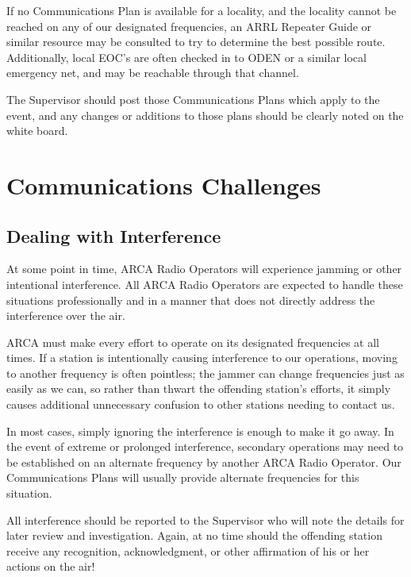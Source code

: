 \documentclass[pdflatex,letterpaper,twoside,12pt]{book}
\begin{document}
If no Communications Plan is available for a locality, and the locality cannot be reached on any of our designated frequencies, an ARRL Repeater Guide or similar resource may be consulted to try to determine the best possible route.  Additionally, local EOC's are often checked in to ODEN or a similar local emergency net, and may be reachable through that channel.

The Supervisor should post those Communications Plans which apply to the event, and any changes or additions to those plans should be clearly noted on the white board.


\section{Communications Challenges}

\subsection{Dealing with Interference}

At some point in time, ARCA Radio Operators will experience jamming or other intentional interference.  All ARCA Radio Operators are expected to handle these situations professionally and in a manner that does not directly address the interference over the air.

ARCA must make every effort to operate on its designated frequencies at all times.  If a station is intentionally causing interference to our operations, moving to another frequency is often pointless;  the jammer can change frequencies just as easily as we can, so rather than thwart the offending station's efforts, it simply causes additional unnecessary confusion to other stations needing to contact us.

In most cases, simply ignoring the interference is enough to make it go away.  In the event of extreme or prolonged interference, secondary operations may need to be established on an alternate frequency by another ARCA Radio Operator.  Our Communications Plans will usually provide alternate frequencies for this situation.

All interference should be reported to the Supervisor who will note the details for later review and investigation.
Again, at no time should the offending station receive any recognition, acknowledgment, or other affirmation of his or her actions on the air!
\end{document}
